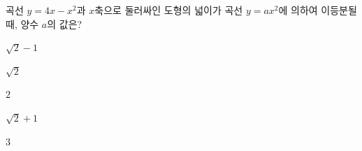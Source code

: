 곡선 $y=4x-x^2$과 $x$축으로 둘러싸인 도형의 넓이가 곡선 $y=ax^2$에 의하여 이등분될 때, 양수 $a$의 값은?
\begin{choices32}{\rule[-3ex]{0pt}{8ex}$\sqrt{2}-1$}{\rule[-3ex]{0pt}{8ex}$\sqrt{2}$}{\rule[-3ex]{0pt}{8ex}$2$}{\rule[-3ex]{0pt}{8ex}$\sqrt{2}+1$}{\rule[-3ex]{0pt}{8ex}$3$}\end{choices32}
